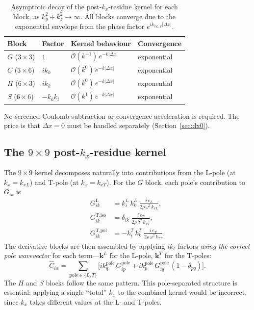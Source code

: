 \documentclass[11pt,a4paper]{article}
\newcommand{\order}[1]{\mathcal{O}\!\left(#1\right)}
\newcommand{\bk}{\mathbf{k}}
\begin{document}
\begin{table}[ht]
\centering
\caption{Asymptotic decay of the post-$k_x$-residue kernel
  for each block, as $k_y^2+k_z^2\to\infty$.
  All blocks converge due to the exponential envelope from the
  phase factor $e^{ik_{xL,T}|\Delta x|}$.}
\label{tab:kx_decay}
\begin{tabular}{@{}llll@{}}
\toprule
Block & Factor & Kernel behaviour & Convergence \\
\midrule
$G$ ($3\times 3$) & $1$        & $\order{k^{-1}}\,e^{-k|\Delta x|}$ & exponential \\
$C$ ($3\times 6$) & $ik_k$     & $\order{k^0}\,e^{-k|\Delta x|}$    & exponential \\
$H$ ($6\times 3$) & $ik_k$     & $\order{k^0}\,e^{-k|\Delta x|}$    & exponential \\
$S$ ($6\times 6$) & $-k_k k_l$ & $\order{k^1}\,e^{-k|\Delta x|}$    & exponential \\
\bottomrule
\end{tabular}
\end{table}

No screened-Coulomb subtraction or convergence acceleration
is required.
The price is that $\Delta x = 0$ must be handled
separately (Section~\ref{sec:dx0}).

\subsection{The \texorpdfstring{$9\times 9$}{9x9} post-\texorpdfstring{$k_x$}{kx}-residue kernel}

The $9\times 9$ kernel decomposes naturally into contributions
from the L-pole (at $k_x = k_{xL}$) and T-pole (at
$k_x = k_{xT}$).
For the $G$ block, each pole's contribution to $G_{ik}$ is
\begin{equation}\label{eq:G_poles}
\begin{aligned}
  G^{\text{L}}_{ik} &= k^L_i\,k^L_k\;\frac{i\,e_L}{2\rho\,\omega^2\,k_{xL}},\\[2pt]
  G^{\text{T,iso}}_{ik} &= \delta_{ik}\;\frac{i\,e_T}{2\rho\,\beta^2\,k_{xT}},\\[2pt]
  G^{\text{T,pol}}_{ik} &= -k^T_i\,k^T_k\;\frac{i\,e_T}{2\rho\,\omega^2\,k_{xT}}.
\end{aligned}
\end{equation}
The derivative blocks are then assembled by applying
$ik_\ell$ factors \emph{using the correct pole wavevector}
for each term---$\bk^L$ for the L-pole, $\bk^T$ for the
T-poles:
\begin{equation}\label{eq:C_from_poles}
  \hat{C}_{i\alpha} = \sum_{\text{pole}\in\{L,T\}}
  \bigl[ik^\text{pole}_q\,G^\text{pole}_{ip}
  + ik^\text{pole}_p\,G^\text{pole}_{iq}\,(1-\delta_{pq})\bigr].
\end{equation}
The $H$ and $S$ blocks follow the same pattern.
This pole-separated structure is essential: applying a
single ``total'' $k_x$ to the combined kernel would be
incorrect, since $k_x$ takes different values at the
L- and T-poles.
\end{document}
